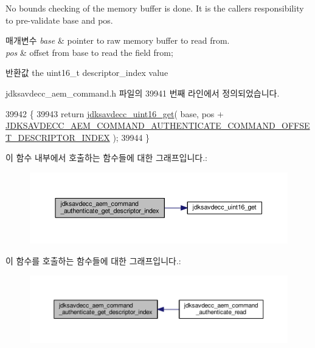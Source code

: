 No bounds checking of the memory buffer is done. It is the caller\textquotesingle{}s responsibility to pre-\/validate base and pos.


\begin{DoxyParams}{매개변수}
{\em base} & pointer to raw memory buffer to read from. \\
\hline
{\em pos} & offset from base to read the field from; \\
\hline
\end{DoxyParams}
\begin{DoxyReturn}{반환값}
the uint16\+\_\+t descriptor\+\_\+index value 
\end{DoxyReturn}


jdksavdecc\+\_\+aem\+\_\+command.\+h 파일의 39941 번째 라인에서 정의되었습니다.


\begin{DoxyCode}
39942 \{
39943     \textcolor{keywordflow}{return} \hyperlink{group__endian_ga3fbbbc20be954aa61e039872965b0dc9}{jdksavdecc\_uint16\_get}( base, pos + 
      \hyperlink{group__command__authenticate_gafaa8d369e9f1badb16456baedc015ae1}{JDKSAVDECC\_AEM\_COMMAND\_AUTHENTICATE\_COMMAND\_OFFSET\_DESCRIPTOR\_INDEX}
       );
39944 \}
\end{DoxyCode}


이 함수 내부에서 호출하는 함수들에 대한 그래프입니다.\+:
\nopagebreak
\begin{figure}[H]
\begin{center}
\leavevmode
\includegraphics[width=350pt]{group__command__authenticate_gaa20d61859334e4bf12677ccc80220622_cgraph}
\end{center}
\end{figure}




이 함수를 호출하는 함수들에 대한 그래프입니다.\+:
\nopagebreak
\begin{figure}[H]
\begin{center}
\leavevmode
\includegraphics[width=350pt]{group__command__authenticate_gaa20d61859334e4bf12677ccc80220622_icgraph}
\end{center}
\end{figure}



